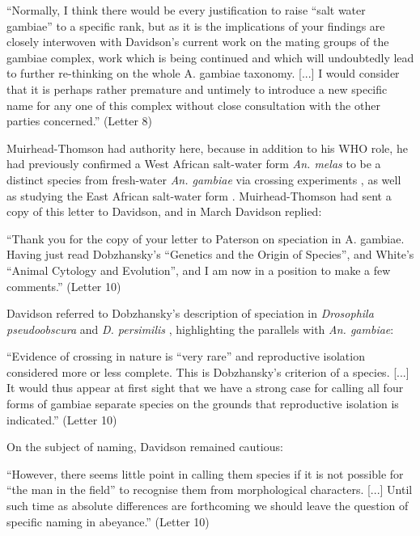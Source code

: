 \documentclass[a4paper,11pt,abstracton,hidelinks]{scrartcl}
\begin{document}
\begin{displayquote}
``Normally, I think there would be every justification to raise ``salt water gambiae'' to a specific rank, but as it is the implications of your findings are closely interwoven with Davidson's current work on the mating groups of the gambiae complex, work which is being continued and which will undoubtedly lead to further re-thinking on the whole A. gambiae taxonomy. [...] I would consider that it is perhaps rather premature and untimely to introduce a new specific name for any one of this complex without close consultation with the other parties concerned.'' (Letter 8)
\end{displayquote}

Muirhead-Thomson had authority here, because in addition to his WHO role, he had previously confirmed a West African salt-water form \textit{An. melas} to be a distinct species from fresh-water \textit{An. gambiae} via crossing experiments \citep{MuirheadThomson1948}, as well as studying the East African salt-water form \citep{MuirheadThomson1951}. Muirhead-Thomson had sent a copy of this letter to Davidson, and in March Davidson replied:

\begin{displayquote}
``Thank you for the copy of your letter to Paterson on speciation in A. gambiae. Having just read Dobzhansky's ``Genetics and the Origin of Species'', and White's ``Animal Cytology and Evolution'', and I am now in a position to make a few comments.'' (Letter 10)
\end{displayquote}

Davidson referred to Dobzhansky's description of speciation in \textit{Drosophila pseudoobscura} and \textit{D. persimilis} \citep{Dobzhansky1951}, highlighting the parallels with \textit{An. gambiae}:

\begin{displayquote}
``Evidence of crossing in nature is ``very rare'' and reproductive isolation considered more or less complete. This is Dobzhansky's criterion of a species. [...] It would thus appear at first sight that we have a strong case for calling all four forms of gambiae separate species on the grounds that reproductive isolation is indicated.'' (Letter 10)
\end{displayquote}

On the subject of naming, Davidson remained cautious:

\begin{displayquote}
``However, there seems little point in calling them species if it is not possible for ``the man in the field'' to recognise them from morphological characters. [...] Until such time as absolute differences are forthcoming we should leave the question of specific naming in abeyance.'' (Letter 10)
\end{displayquote}
\end{document}
